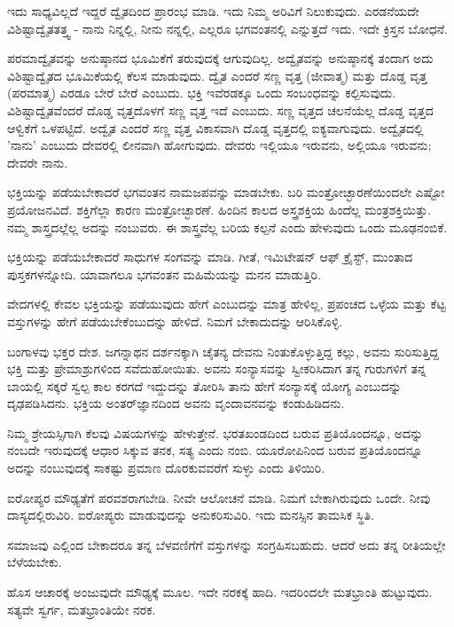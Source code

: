 ಇದು ಸಾಧ್ಯವಿಲ್ಲದೆ ಇದ್ದರೆ ದ್ವೈತದಿಂದ ಪ್ರಾರಂಭ ಮಾಡಿ. ಇದು ನಿಮ್ಮ ಅರಿವಿಗೆ ನಿಲುಕುವುದು. ಎರಡನೆಯದೇ ವಿಶಿಷ್ಟಾದ್ವೈತತತ್ತ್ವ - ನಾನು ನಿನ್ನಲ್ಲಿ, ನೀನು ನನ್ನಲ್ಲಿ, ಎಲ್ಲರೂ ಭಗವಂತನಲ್ಲಿ ಎನ್ನುತ್ತದೆ ಇದು. ಇದೇ ಕ್ರಿಸ್ತನ ಬೋಧನೆ.

ಪರಮಾದ್ವೈತವನ್ನು ಅನುಷ್ಠಾನದ ಭೂಮಿಕೆಗೆ ತರುವುದಕ್ಕೆ ಆಗುವುದಿಲ್ಲ. ಅದ್ವೈತವನ್ನು ಅನುಷ್ಠಾನಕ್ಕೆ ತಂದಾಗ ಅದು ವಿಶಿಷ್ಟಾದ್ವೈತದ ಭೂಮಿಕೆಯಲ್ಲಿ ಕೆಲಸ ಮಾಡುವುದು. ದ್ವೈತ ಎಂದರೆ ಸಣ್ಣ ವೃತ್ತ (ಜೀವಾತ್ಮ) ಮತ್ತು ದೊಡ್ಡ ವೃತ್ತ (ಪರಮಾತ್ಮ) ಎರಡೂ ಬೇರೆ ಬೇರೆ ಎಂಬುದು. ಭಕ್ತಿ ಇವೆರಡಕ್ಕೂ ಒಂದು ಸಂಬಂಧವನ್ನು ಕಲ್ಪಿಸುವುದು. ವಿಶಿಷ್ಟಾದ್ವೈತವೆಂದರೆ ದೊಡ್ಡ ವೃತ್ತದೊಳಗೆ ಸಣ್ಣ ವೃತ್ತ ಇದೆ ಎಂಬುದು. ಸಣ್ಣ ವೃತ್ತದ ಚಲನೆಯೆಲ್ಲ ದೊಡ್ಡ ವೃತ್ತದ ಆಳ್ವಿಕೆಗೆ ಒಳಪಟ್ಟಿದೆ. ಅದ್ವೈತ ಎಂದರೆ ಸಣ್ಣ ವೃತ್ತ ವಿಕಾಸವಾಗಿ ದೊಡ್ಡ ವೃತ್ತದಲ್ಲಿ ಐಕ್ಯವಾಗುವುದು. ಅದ್ವೈತದಲ್ಲಿ 'ನಾನು' ಎಂಬುದು ದೇವರಲ್ಲಿ ಲೀನವಾಗಿ ಹೋಗುವುದು. ದೇವರು ಇಲ್ಲಿಯೂ ಇರುವನು, ಅಲ್ಲಿಯೂ ಇರುವನು; ದೇವರೇ ನಾನು.

ಭಕ್ತಿಯನ್ನು ಪಡೆಯಬೇಕಾದರೆ ಭಗವಂತನ ನಾಮಜಪವನ್ನು ಮಾಡಬೇಕು. ಬರಿ ಮಂತ್ರೋಚ್ಛಾರಣೆಯಿಂದಲೇ ಎಷ್ಟೋ ಪ್ರಯೋಜನವಿದೆ. ಶಕ್ತಿಗೆಲ್ಲಾ ಕಾರಣ ಮಂತ್ರೋಚ್ಛಾರಣೆ. ಹಿಂದಿನ ಕಾಲದ ಅಸ್ತ್ರಶಕ್ತಿಯ ಹಿಂದೆಲ್ಲ ಮಂತ್ರಶಕ್ತಿಯಿತ್ತು. ನಮ್ಮ ಶಾಸ್ತ್ರದಲ್ಲೆಲ್ಲ ಅದನ್ನು ನಂಬುವರು. ಈ ಶಾಸ್ತ್ರವೆಲ್ಲ ಬರಿಯ ಕಲ್ಪನೆ ಎಂದು ಹೇಳುವುದು ಒಂದು ಮೂಢನಂಬಿಕೆ.

ಭಕ್ತಿಯನ್ನು ಪಡೆಯಬೇಕಾದರೆ ಸಾಧುಗಳ ಸಂಗವನ್ನು ಮಾಡಿ. ಗೀತೆ, ಇಮಿಟೇಷನ್ ಆಫ್ ಕ್ರೈಸ್ಟ್,  ಮುಂತಾದ ಪುಸ್ತಕಗಳನ್ನೋದಿ. ಯಾವಾಗಲೂ ಭಗವಂತನ ಮಹಿಮೆಯನ್ನು ಮನನ ಮಾಡುತ್ತಿರಿ.

ವೇದಗಳಲ್ಲಿ ಕೇವಲ ಭಕ್ತಿಯನ್ನು ಪಡೆಯುವುದು ಹೇಗೆ ಎಂಬುದನ್ನು ಮಾತ್ರ ಹೇಳಿಲ್ಲ, ಪ್ರಪಂಚದ ಒಳ್ಳೆಯ ಮತ್ತು ಕೆಟ್ಟ ವಸ್ತುಗಳನ್ನು ಹೇಗೆ ಪಡೆಯಬೇಕೆಂಬುದನ್ನು ಹೇಳಿದೆ. ನಿಮಗೆ ಬೇಕಾದುದನ್ನು ಆರಿಸಿಕೊಳ್ಳಿ.

ಬಂಗಾಳವು ಭಕ್ತರ ದೇಶ. ಜಗನ್ನಾಥನ ದರ್ಶನಕ್ಕಾಗಿ ಚೈತನ್ಯ ದೇವನು ನಿಂತುಕೊಳ್ಳುತ್ತಿದ್ದ ಕಲ್ಲು, ಅವನು ಸುರಿಸುತ್ತಿದ್ದ ಭಕ್ತಿ ಮತ್ತು ಪ್ರೇಮಾಶ್ರುಗಳಿಂದ ಸವೆದುಹೋಯಿತು. ಅವನು ಸಂನ್ಯಾಸವನ್ನು ಸ್ವೀಕರಿಸಿದಾಗ ತನ್ನ ಗುರುಗಳಿಗೆ ತನ್ನ ಬಾಯಲ್ಲಿ ಸಕ್ಕರೆ ಸ್ವಲ್ಪ ಕಾಲ ಕರಗದೆ ಇದ್ದುದನ್ನು ತೋರಿಸಿ ತಾನು ಹೇಗೆ ಸಂನ್ಯಾಸಕ್ಕೆ ಯೋಗ್ಯ ಎಂಬುದನ್ನು ದೃಢಪಡಿಸಿದನು. ಭಕ್ತಿಯ ಅಂತರ್‌ಜ್ಞಾನದಿಂದ ಅವನು ವೃಂದಾವನವನ್ನು ಕಂಡುಹಿಡಿದನು.

ನಿಮ್ಮ ಶ್ರೇಯಸ್ಸಿಗಾಗಿ ಕೆಲವು ವಿಷಯಗಳನ್ನು ಹೇಳುತ್ತೇನೆ. ಭರತಖಂಡದಿಂದ ಬರುವ ಪ್ರತಿಯೊಂದನ್ನೂ, ಅದನ್ನು ನಂಬದೇ ಇರುವುದಕ್ಕೆ ಆಧಾರ ಸಿಕ್ಕುವ ತನಕ, ಸತ್ಯ ಎಂದು ನಂಬಿ. ಯೂರೋಪಿನಿಂದ ಬರುವ ಪ್ರತಿಯೊಂದನ್ನೂ ಅದನ್ನು ನಂಬುವುದಕ್ಕೆ ಸಾಕಷ್ಟು ಪ್ರಮಾಣ ದೊರಕುವವರೆಗೆ ಸುಳ್ಳು ಎಂದು ತಿಳಿಯಿರಿ.

ಐರೋಪ್ಯರ ಮೌಢ್ಯತೆಗೆ ಪರವಶರಾಗಬೇಡಿ. ನೀವೇ ಆಲೋಚನೆ ಮಾಡಿ. ನಿಮಗೆ ಬೇಕಾಗಿರುವುದು ಒಂದೇ. ನೀವು ದಾಸ್ಯದಲ್ಲಿರುವಿರಿ. ಐರೋಪ್ಯರು ಮಾಡುವುದನ್ನು ಅನುಕರಿಸುವಿರಿ. ಇದು ಮನಸ್ಸಿನ ತಾಮಸಿಕ ಸ್ಥಿತಿ.

ಸಮಾಜವು ಎಲ್ಲಿಂದ ಬೇಕಾದರೂ ತನ್ನ ಬೆಳವಣಿಗೆಗೆ ವಸ್ತುಗಳನ್ನು ಸಂಗ್ರಹಿಸಬಹುದು. ಆದರೆ ಅದು ತನ್ನ ರೀತಿಯಲ್ಲೇ ಬೆಳೆಯಬೇಕು.

ಹೊಸ ಆಚಾರಕ್ಕೆ ಅಂಜುವುದೇ ಮೌಢ್ಯಕ್ಕೆ ಮೂಲ. ಇದೇ ನರಕಕ್ಕೆ ಹಾದಿ. ಇದರಿಂದಲೇ ಮತಭ್ರಾಂತಿ ಹುಟ್ಟುವುದು. ಸತ್ಯವೇ ಸ್ವರ್ಗ, ಮತಭ್ರಾಂತಿಯೇ ನರಕ.

